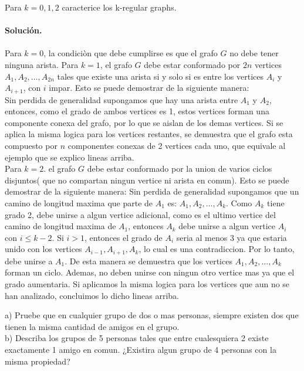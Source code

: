 \documentclass[12pt]{article}
\newenvironment{ejercicio}[2][Ejercicio]{\begin{trivlist}
\item[\hskip \labelsep {\bfseries #1}\hskip \labelsep {\bfseries #2.}]}{\end{trivlist}}
\begin{document}
\begin{ejercicio}{1.1.5}
\end{ejercicio}
Para $k = 0, 1, 2$ caracterice los k-regular graphs. \\\\
\textbf{Solución.} 
\\\\
Para $k = 0$, la condiciòn que debe cumplirse es que el grafo $G$ no debe tener ninguna arista.
Para $k = 1$, el grafo $G$ debe estar conformado por $2n$ vertices $A_1, A_2, \ldots, A_{2n}$ tales que existe una arista si y solo si es entre los vertices $A_i$ y $A_{i+1}$, con $i$ impar.
Esto se puede demostrar de la siguiente manera: \\
Sin perdida de generalidad supongamos que hay una arista entre $A_1$ y $A_2$, entonces, como el grado de ambos vertices es 1, estos vertices forman una componente conexa del grafo, por lo que se aislan de los demas vertices. Si se aplica la misma logica para los vertices restantes, se demuestra que el grafo esta compuesto por $n$ componentes conexas de 2 vertices cada uno, que equivale al ejemplo que se explico lineas arriba. \\
Para $k = 2$. el grafo $G$ debe estar conformado por la union de varios ciclos disjuntos( que no compartan ningun vertice ni arista en comun). Esto se puede demostrar de la siguiente manera:
Sin perdida de generalidad supongamos que un camino de longitud maxima que parte de $A_1$ es:
$A_1, A_2, \ldots, A_k$. Como $A_k$ tiene grado 2, debe unirse a algun vertice adicional, como es el ultimo vertice del camino de longitud maxima de $A_1$, entonces $A_k$ debe unirse a algun vertice $A_i$ con $i \leq k-2 $. Si $i>1$, entonces el grado de $A_i$ seria al menos 3 ya que estaria unido con los vertices $A_{i-1}, A_{i+1}, A_k$, lo cual es una contradiccion. Por lo tanto, debe unirse a $A_1$. De esta manera se demuestra que los vertices $A_1, A_2, \ldots, A_k$ forman un ciclo. Ademas, no deben unirse con ningun otro vertice mas ya que el grado aumentaria. Si aplicamos la misma logica para los vertices que aun no se han analizado, concluimos lo dicho lineas arriba.

\begin{ejercicio}{1.1.6}
\end{ejercicio}
a) Pruebe que en cualquier grupo de dos o mas personas, siempre existen dos que tienen la misma cantidad de amigos en el grupo.
\\
b) Describa los grupos de 5 personas tales que entre cualesquiera 2 existe exactamente 1 amigo en comun. ¿Existira algun grupo de 4 personas con la misma propiedad?
\\\\
\end{document}
